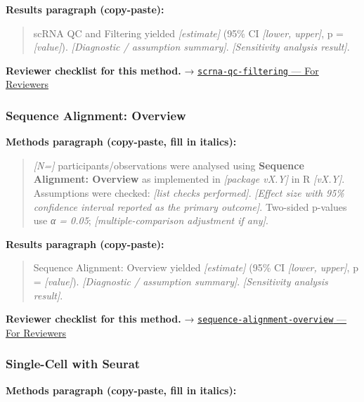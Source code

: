\documentclass[
]{article}
\begin{document}
\textbf{Results paragraph (copy-paste):}

\begin{quote}
scRNA QC and Filtering yielded \emph{{[}estimate{]}} (95\% CI
\emph{{[}lower, upper{]}}, p = \emph{{[}value{]}}). \emph{{[}Diagnostic
/ assumption summary{]}}. \emph{{[}Sensitivity analysis result{]}}.
\end{quote}

\textbf{Reviewer checklist for this method.} →
\href{../chapters/12-bioinformatics/scrna-qc-filtering.Rmd\#for-reviewers}{\texttt{scrna-qc-filtering}
--- For Reviewers}

\subsubsection{Sequence Alignment:
Overview}\label{sequence-alignment-overview}

\textbf{Methods paragraph (copy-paste, fill in italics):}

\begin{quote}
\emph{{[}N={]}} participants/observations were analysed using
\textbf{Sequence Alignment: Overview} as implemented in \emph{{[}package
vX.Y{]}} in R \emph{{[}vX.Y{]}}. Assumptions were checked: \emph{{[}list
checks performed{]}}. \emph{{[}Effect size with 95\% confidence interval
reported as the primary outcome{]}}. Two-sided p-values use \emph{α =
0.05}; \emph{{[}multiple-comparison adjustment if any{]}}.
\end{quote}

\textbf{Results paragraph (copy-paste):}

\begin{quote}
Sequence Alignment: Overview yielded \emph{{[}estimate{]}} (95\% CI
\emph{{[}lower, upper{]}}, p = \emph{{[}value{]}}). \emph{{[}Diagnostic
/ assumption summary{]}}. \emph{{[}Sensitivity analysis result{]}}.
\end{quote}

\textbf{Reviewer checklist for this method.} →
\href{../chapters/12-bioinformatics/sequence-alignment-overview.Rmd\#for-reviewers}{\texttt{sequence-alignment-overview}
--- For Reviewers}

\subsubsection{Single-Cell with Seurat}\label{single-cell-with-seurat}

\textbf{Methods paragraph (copy-paste, fill in italics):}
\end{document}
